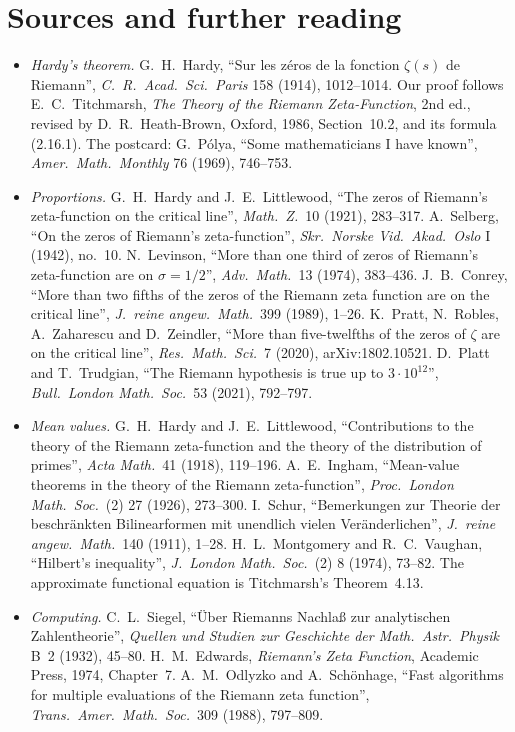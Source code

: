 \section*{Sources and further reading}

\begin{itemize}
\item \emph{Hardy's theorem.} G.~H.~Hardy, ``Sur les zéros de la fonction $\zeta(s)$ de Riemann'', \emph{C.\ R.\ Acad.\ Sci.\ Paris} 158 (1914), 1012--1014. Our proof follows E.~C.~Titchmarsh, \emph{The Theory of the Riemann Zeta-Function}, 2nd ed., revised by D.~R.~Heath-Brown, Oxford, 1986, Section~10.2, and its formula (2.16.1). The postcard: G.~Pólya, ``Some mathematicians I have known'', \emph{Amer.\ Math.\ Monthly} 76 (1969), 746--753.
\item \emph{Proportions.} G.~H.~Hardy and J.~E.~Littlewood, ``The zeros of Riemann's zeta-function on the critical line'', \emph{Math.\ Z.}\ 10 (1921), 283--317. A.~Selberg, ``On the zeros of Riemann's zeta-function'', \emph{Skr.\ Norske Vid.\ Akad.\ Oslo} I (1942), no.~10. N.~Levinson, ``More than one third of zeros of Riemann's zeta-function are on $\sigma=1/2$'', \emph{Adv.\ Math.}\ 13 (1974), 383--436. J.~B.~Conrey, ``More than two fifths of the zeros of the Riemann zeta function are on the critical line'', \emph{J.\ reine angew.\ Math.}\ 399 (1989), 1--26. K.~Pratt, N.~Robles, A.~Zaharescu and D.~Zeindler, ``More than five-twelfths of the zeros of $\zeta$ are on the critical line'', \emph{Res.\ Math.\ Sci.}\ 7 (2020), arXiv:1802.10521. D.~Platt and T.~Trudgian, ``The Riemann hypothesis is true up to $3\cdot10^{12}$'', \emph{Bull.\ London Math.\ Soc.}\ 53 (2021), 792--797.
\item \emph{Mean values.} G.~H.~Hardy and J.~E.~Littlewood, ``Contributions to the theory of the Riemann zeta-function and the theory of the distribution of primes'', \emph{Acta Math.}\ 41 (1918), 119--196. A.~E.~Ingham, ``Mean-value theorems in the theory of the Riemann zeta-function'', \emph{Proc.\ London Math.\ Soc.}\ (2) 27 (1926), 273--300. I.~Schur, ``Bemerkungen zur Theorie der beschränkten Bilinearformen mit unendlich vielen Veränderlichen'', \emph{J.\ reine angew.\ Math.}\ 140 (1911), 1--28. H.~L.~Montgomery and R.~C.~Vaughan, ``Hilbert's inequality'', \emph{J.\ London Math.\ Soc.}\ (2) 8 (1974), 73--82. The approximate functional equation is Titchmarsh's Theorem~4.13.
\item \emph{Computing.} C.~L.~Siegel, ``Über Riemanns Nachlaß zur analytischen Zahlentheorie'', \emph{Quellen und Studien zur Geschichte der Math.\ Astr.\ Physik} B~2 (1932), 45--80. H.~M.~Edwards, \emph{Riemann's Zeta Function}, Academic Press, 1974, Chapter~7. A.~M.~Odlyzko and A.~Schönhage, ``Fast algorithms for multiple evaluations of the Riemann zeta function'', \emph{Trans.\ Amer.\ Math.\ Soc.}\ 309 (1988), 797--809.

\end{itemize}
